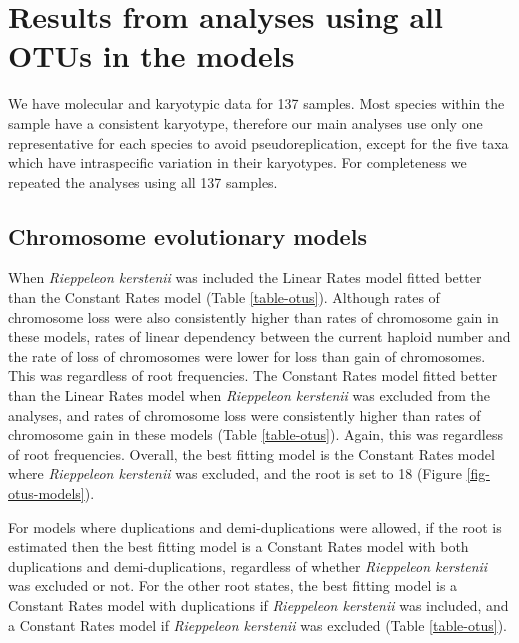 \documentclass[a4paper, 12pt]{article}
\begin{document}
\newpage
\section{Results from analyses using all OTUs in the models}

We have molecular and karyotypic data for 137 samples. Most species within the sample have a consistent karyotype, therefore our main analyses use only one representative for each species to avoid pseudoreplication, except for the five taxa which have intraspecific variation in their karyotypes. For completeness we repeated the analyses using all 137 samples.

\subsection{Chromosome evolutionary models}
When \textit{Rieppeleon kerstenii} was included the Linear Rates model fitted better than the Constant Rates model (Table \ref{table-otus}). Although rates of chromosome loss were also consistently higher than rates of chromosome gain in these models, rates of linear dependency between the current haploid number and the rate of loss of chromosomes were lower for loss than gain of chromosomes. This was regardless of root frequencies. The Constant Rates model fitted better than the Linear Rates model when \textit{Rieppeleon kerstenii} was excluded from the analyses, and rates of chromosome loss were consistently higher than rates of chromosome gain in these models (Table \ref{table-otus}). Again, this was regardless of root frequencies. Overall, the best fitting model is the Constant Rates model where \textit{Rieppeleon kerstenii} was excluded, and the root is set to 18 (Figure \ref{fig-otus-models}). 

\noindent For models where duplications and demi-duplications were allowed, if the root is estimated then the best fitting model is a Constant Rates model with both duplications and demi-duplications, regardless of whether \textit{Rieppeleon kerstenii} was excluded or not. For the other root states, the best fitting model is a Constant Rates model with duplications if \textit{Rieppeleon kerstenii} was included, and a Constant Rates model if \textit{Rieppeleon kerstenii} was excluded (Table \ref{table-otus}). 


\end{document}
